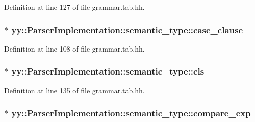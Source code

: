 Definition at line 127 of file grammar.tab.hh.

\hypertarget{unionyy_1_1_parser_implementation_1_1semantic__type_aa5090b76f9d20202b91fbb7033d50796}{
\subsubsection[{case\_\-clause}]{$\ast$ {\bf yy::ParserImplementation::semantic\_\-type::case\_\-clause}}}
\label{unionyy_1_1_parser_implementation_1_1semantic__type_aa5090b76f9d20202b91fbb7033d50796}


Definition at line 108 of file grammar.tab.hh.

\hypertarget{unionyy_1_1_parser_implementation_1_1semantic__type_aa287aba33f28dbda5792611efc51e6f0}{
\subsubsection[{cls}]{$\ast$ {\bf yy::ParserImplementation::semantic\_\-type::cls}}}
\label{unionyy_1_1_parser_implementation_1_1semantic__type_aa287aba33f28dbda5792611efc51e6f0}


Definition at line 135 of file grammar.tab.hh.

\hypertarget{unionyy_1_1_parser_implementation_1_1semantic__type_a29c1f3b4ff8261004ecb0cfbea2f3a8f}{
\subsubsection[{compare\_\-exp}]{$\ast$ {\bf yy::ParserImplementation::semantic\_\-type::compare\_\-exp}}}
\label{unionyy_1_1_parser_implementation_1_1semantic__type_a29c1f3b4ff8261004ecb0cfbea2f3a8f}


